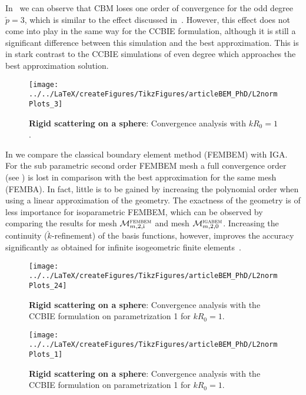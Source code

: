 In~ we can observe that CBM loses one order of convergence for the odd degree $\check{p}=3$, which is similar to the effect discussed in~\cite{Gomez2016tvc}. However, this effect does not come into play in the same way for the CCBIE formulation, although it is still a significant difference between this simulation and the best approximation. This is in stark contrast to the CCBIE simulations of even degree which approaches the best approximation solution.
\begin{figure}
	\centering
	\texttt{[image: ../../LaTeX/createFigures/TikzFigures/articleBEM\_PhD/L2normPlots\_3]}
	\caption{\textbf{Rigid scattering on a sphere}: Convergence analysis with $kR_0=1$.}
	\label{Fig3:S1_cgComp}
\end{figure}


In  we compare the classical boundary element method (FEMBEM) with IGA. For the sub parametric second order FEMBEM mesh a full convergence order (see ) is lost in comparison with the best approximation for the same mesh (FEMBA). In fact, little is to be gained by increasing the polynomial order when using a linear approximation of the geometry. The exactness of the geometry is of less importance for isoparametric FEMBEM, which can be observed by comparing the results for mesh ${\cal M}_{m,2,\mathrm{i}}^{\textsc{fembem}}$ and mesh ${\cal M}_{m,2,0}^{\textsc{igabem}}$. Increasing the continuity ($\check{k}$-refinement) of the basis functions, however, improves the accuracy significantly as obtained for infinite isogeometric finite elements~\cite{Venas2018iao}.
\begin{figure}
	\centering
	\texttt{[image: ../../LaTeX/createFigures/TikzFigures/articleBEM\_PhD/L2normPlots\_24]}
	\caption{\textbf{Rigid scattering on a sphere}: Convergence analysis with the CCBIE formulation on parametrization 1 for $kR_0=1$.}
	\label{Fig3:convergenceAnalysis}
\end{figure}
\begin{figure}
	\centering
	\texttt{[image: ../../LaTeX/createFigures/TikzFigures/articleBEM\_PhD/L2normPlots\_1]}
	\caption{\textbf{Rigid scattering on a sphere}: Convergence analysis with the CCBIE formulation on parametrization 1 for $kR_0=1$.}
	\label{Fig3:convergenceAnalysis_nepw}
\end{figure}


